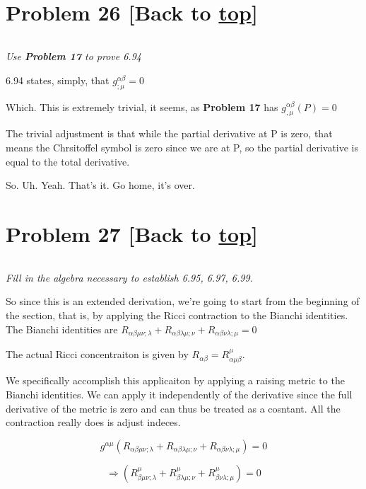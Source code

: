\documentclass[landscape,letterpaper,10pt,english]{article}
\begin{document}
    \hypertarget{problem-26-back-to-top}{%
\section{\texorpdfstring{Problem 26 {[}Back to
\hyperref[toc]{top}{]}}{Problem 26 {[}Back to {]}}}\label{problem-26-back-to-top}}

\[\label{P26}\]

\emph{Use \textbf{Problem 17} to prove 6.94}

    6.94 states, simply, that \(g^{\alpha\beta}_{;\mu} = 0\)

Which. This is extremely trivial, it seems, as \textbf{Problem 17} has
\(g^{\alpha\beta}_{,\mu}(P)=0\)

The trivial adjustment is that while the partial derivative at P is
zero, that means the Chrsitoffel symbol is zero since we are at P, so
the partial derivative is equal to the total derivative.

So. Uh. Yeah. That's it. Go home, it's over.

    \hypertarget{problem-27-back-to-top}{%
\section{\texorpdfstring{Problem 27 {[}Back to
\hyperref[toc]{top}{]}}{Problem 27 {[}Back to {]}}}\label{problem-27-back-to-top}}

\[\label{P27}\]

\emph{Fill in the algebra necessary to establish 6.95, 6.97, 6.99.}

So since this is an extended derivation, we're going to start from the
beginning of the section, that is, by applying the Ricci contraction to
the Bianchi identities. The Bianchi identities are
\(R_{\alpha\beta\mu\nu; \lambda} + R_{\alpha\beta\lambda\mu;\nu} + R_{\alpha\beta\nu\lambda;\mu} = 0\)

The actual Ricci concentraiton is given by
\(R_{\alpha\beta} = R^\mu_{\alpha\mu\beta}\).

We specifically accomplish this applicaiton by applying a raising metric
to the Bianchi identities. We can apply it independently of the
derivative since the full derivative of the metric is zero and can thus
be treated as a cosntant. All the contraction really does is adjust
indeces.

\[g^{\alpha\mu}(R_{\alpha\beta\mu\nu;\lambda} + R_{\alpha\beta\lambda\mu;\nu} + R_{\alpha\beta\nu\lambda;\mu}) = 0\]

\[\Rightarrow (R^\mu_{\beta\mu\nu;\lambda} + R^\mu_{\beta\lambda\mu;\nu} + R^\mu_{\beta\nu\lambda;\mu}) = 0\]
\end{document}
